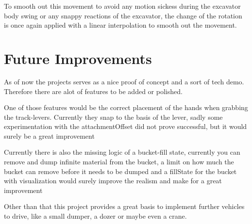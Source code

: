 \documentclass[journal]{vgtc}                     %
\begin{document}
To smooth out this movement to avoid any motion sickess during the excavator body swing or any snappy reactions of the excavator, the change of the rotation is once again applied with a linear interpolation to smooth out the movement.

\section{Future Improvements}

As of now the projects serves as a nice proof of concept and a sort of tech demo. Therefore there are alot of features to be added or polished.

One of those features would be the correct placement of the hands when grabbing the track-levers. Currently they snap to the basis of the lever, sadly some experimentation with the attachmentOffset did not prove successful, but it would surely be a great improvement

Currently there is also the missing logic of a bucket-fill state, currently you can remove and dump infinite material from the bucket, a limit on how much the bucket can remove before it needs to be dumped and a fillState for the bucket with visualization would surely improve the realism and make for a great improvement

Other than that this project provides a great basis to implement further vehicles to drive, like a small dumper, a dozer or maybe even a crane.




%
%
%


\end{document}
